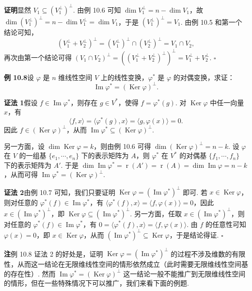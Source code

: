 \documentclass[UTF8, 12pt, fontset=fandol, oneside]{ctexart}
\begin{document}
\noindent\textbf{证明}\quad 显然 $V_1\subseteq (V_1^\perp)^\perp$. 由例 10.6 可知 $\dim V_1^\perp=n-\dim V_1$，故 $\dim (V_1^\perp)^\perp=n-\dim V_1^\perp=\dim V_1$，于是 $(V_1^\perp)^\perp=V_1$. 由例 10.5 和第一个结论可知，
\[
(V_1^\perp+V_2^\perp)^\perp=(V_1^\perp)^\perp\cap (V_2^\perp)^\perp=V_1\cap V_2,
\]
再次由第一个结论可得 $(V_1\cap V_2)^\perp=((V_1^\perp+V_2^\perp)^\perp)^\perp=V_1^\perp+V_2^\perp$. $\square$

\noindent\textbf{例 10.8}\quad 设 $\varphi$ 是 $n$ 维线性空间 $V$ 上的线性变换，$\varphi^*$ 是 $\varphi$ 的对偶变换，求证：
\[
\operatorname{Im}\varphi^*=(\operatorname{Ker}\varphi)^\perp.
\]

\noindent\textbf{证法 1}\quad 假设 $f\in\operatorname{Im}\varphi^*$，则存在 $g\in V^*$，使得 $f=\varphi^*(g)$. 对 $\operatorname{Ker}\varphi$ 中任一向量 $x$，有
\[
\langle f,x\rangle=\langle\varphi^*(g),x\rangle=\langle g,\varphi(x)\rangle=0.
\]
因此 $f\in(\operatorname{Ker}\varphi)^\perp$，从而 $\operatorname{Im}\varphi^*\subseteq(\operatorname{Ker}\varphi)^\perp$.

另一方面，设 $\dim\operatorname{Ker}\varphi=k$，则由例 10.6 可得 $\dim(\operatorname{Ker}\varphi)^\perp=n-k$. 设 $\varphi$ 在 $V$ 的一组基 $\{e_1,\cdots,e_n\}$ 下的表示矩阵为 $A$，则 $\varphi^*$ 在 $V^*$ 的对偶基 $\{f_1,\cdots,f_n\}$ 下的表示矩阵为 $A'$. 于是 $\dim\operatorname{Im}\varphi^*=\operatorname{r}(A')=\operatorname{r}(A)=\dim\operatorname{Im}\varphi=n-k$，从而可得 $\operatorname{Im}\varphi^*=(\operatorname{Ker}\varphi)^\perp$.

\noindent\textbf{证法 2}\quad 由例 10.7 可知，我们只要证明 $\operatorname{Ker}\varphi=(\operatorname{Im}\varphi^*)^\perp$ 即可. 若 $x\in\operatorname{Ker}\varphi$，则对任意的 $\varphi^*(f)\in\operatorname{Im}\varphi^*$，有 $\langle\varphi^*(f),x\rangle=\langle f,\varphi(x)\rangle=0$，因此 $x\in(\operatorname{Im}\varphi^*)^\perp$，即 $\operatorname{Ker}\varphi\subseteq(\operatorname{Im}\varphi^*)^\perp$. 另一方面，任取 $x\in(\operatorname{Im}\varphi^*)^\perp$，则对任意的 $\varphi^*(f)\in\operatorname{Im}\varphi^*$，有 $0=\langle\varphi^*(f),x\rangle=\langle f,\varphi(x)\rangle$. 由 $f$ 的任意性可知 $\varphi(x)=0$，即 $x\in\operatorname{Ker}\varphi$，从而 $(\operatorname{Im}\varphi^*)^\perp\subseteq\operatorname{Ker}\varphi$，于是结论得证. $\square$

\noindent\textbf{注}\quad 例 10.8 证法 2 的好处是，证明 $\operatorname{Ker}\varphi=(\operatorname{Im}\varphi^*)^\perp$ 的过程不涉及维数的有限性，从而这一结论在无限维线性空间的情形依然成立（此时需要无限维线性空间基的存在性）. 然而 $\operatorname{Im}\varphi^*=(\operatorname{Ker}\varphi)^\perp$ 这一结论一般不能推广到无限维线性空间的情形，但在一些特殊情况下可以推广，我们来看下面的例题.
\end{document}

